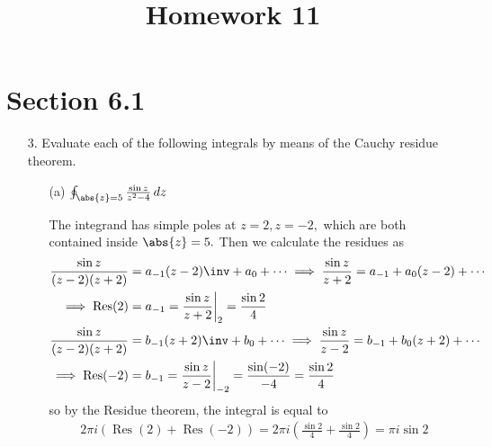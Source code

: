 \documentclass{article}
\DeclareMathOperator{\Res}{Res}
\begin{document}
\title{Homework 11}
\maketitle
\thispagestyle{fancy}

\section*{Section 6.1}

\begin{itemize}
	\item[3.] Evaluate each of the following integrals by means of the Cauchy residue theorem.
		\begin{itemize}
			\item[(a)] $\oint_{\abs{z}=5} \frac{\sin z}{z^2-4}\, dz$
				\begin{soln}
					The integrand has simple poles at $z=2, z=-2,$ which are both contained inside $\abs{z}=5.$ Then we calculate the residues as
					\begin{align*}
						\frac{\sin z}{(z-2)(z+2)} &= a_{-1} (z-2)\inv + a_0 + \cdots \implies \frac{\sin z}{z+2} = a_{-1} + a_0(z-2) + \cdots \\
						\implies \Res(2) &= a_{-1} = \frac{\sin z}{z+2}\bigg\vert_2 = \frac{\sin 2}{4} \\
						\frac{\sin z}{(z-2)(z+2)} &= b_{-1} (z+2)\inv + b_0 + \cdots \implies \frac{\sin z}{z-2} = b_{-1} + b_0(z+2) + \cdots \\
						\implies \Res(-2) &= b_{-1} = \frac{\sin z}{z-2}\bigg\vert_{-2} = \frac{\sin (-2)}{-4} = \frac{\sin 2}{4}
					\end{align*}
					so by the Residue theorem, the integral is equal to
					\begin{align*}
						2\pi i\left( \Res(2) + \Res(-2) \right) = 2\pi i\left( \frac{\sin 2}{4} + \frac{\sin 2}{4} \right) = \pi i \sin 2
					\end{align*}
				\end{soln}


\end{itemize}
\end{itemize}
\end{document}
